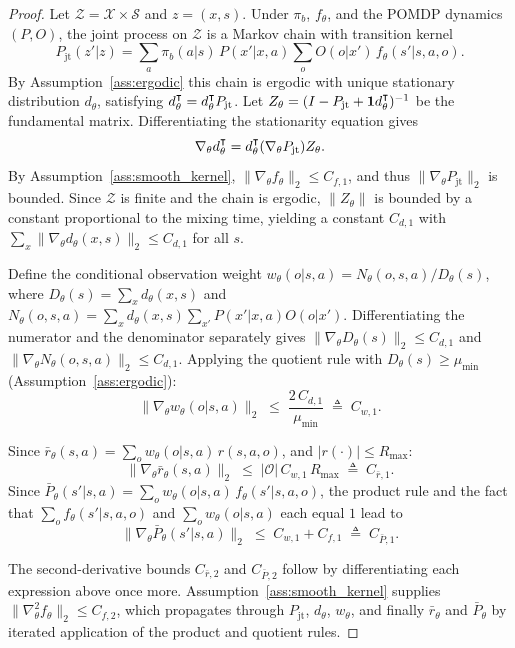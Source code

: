 \documentclass[12pt]{article}
\newcommand\raiseT[2]{\raisebox{0.25ex}{$#1#2$}
}
\renewcommand{\[}{\left[}
\renewcommand{\]}{\right]}
\renewcommand{\(}{\left(}
\renewcommand{\)}{\right)}
\newcounter{l1}
\newcounter{l2}
\newcounter{l3}
\renewcommand{\top}{{\mathpalette\raiseT\intercal}}
\newcommand{\Rmax}{R_{\max}}
\begin{document}
\begin{proof}
Let $\mathcal{Z} = \mathcal{X} \times \mathcal{S}$ and $z = (x,s)$. Under $\pi_b$,
$f_\theta$, and the POMDP dynamics $(P, O)$, the joint process on $\mathcal{Z}$ is a
Markov chain with transition kernel
\begin{equation*}
  P_{\mathrm{jt}}(z'|z)
  = \sum_{a} \pi_b(a|s)\, P(x'|x,a) \sum_{o} O(o|x')\, f_\theta(s'|s,a,o).
\end{equation*}
By Assumption~\ref{ass:ergodic} this chain is ergodic with unique stationary
distribution $d_\theta$, satisfying $d_\theta^\top = d_\theta^\top P_{\mathrm{jt}}$.
Let $Z_\theta = (I - P_{\mathrm{jt}} + \mathbf{1} d_\theta^\top)^{-1}$ be the fundamental
matrix. Differentiating the stationarity equation gives
\begin{equation*}
  \nabla_\theta d_\theta^\top = d_\theta^\top (\nabla_\theta P_{\mathrm{jt}}) Z_\theta.
\end{equation*}
By Assumption~\ref{ass:smooth_kernel}, $\|\nabla_\theta f_\theta\|_2 \le C_{f,1}$, and thus
$\|\nabla_\theta P_{\mathrm{jt}}\|_2$ is bounded. Since $\mathcal{Z}$ is finite and the
chain is ergodic, $\|Z_\theta\|$ is bounded by a constant proportional to the mixing
time, yielding a constant $C_{d,1}$ with
$\sum_{x}\|\nabla_\theta d_\theta(x,s)\|_2 \le C_{d,1}$ for all $s$.

Define the conditional observation weight
$w_\theta(o|s,a) = N_\theta(o,s,a) / D_\theta(s)$, where
$D_\theta(s) = \sum_x d_\theta(x,s)$ and
$N_\theta(o,s,a) = \sum_x d_\theta(x,s) \sum_{x'} P(x'|x,a) O(o|x')$.
Differentiating the numerator and the denominator separately gives
$\|\nabla_\theta D_\theta(s)\|_2 \le C_{d,1}$ and
$\|\nabla_\theta N_\theta(o,s,a)\|_2 \le C_{d,1}$.
Applying the quotient rule with $D_\theta(s) \ge \mu_{\min}$ (Assumption~\ref{ass:ergodic}):
\begin{equation*}
  \|\nabla_\theta w_\theta(o|s,a)\|_2
  \;\le\; \frac{2\,C_{d,1}}{\mu_{\min}}
  \;\triangleq\; C_{w,1}.
\end{equation*}

Since $\bar{r}_\theta(s,a) = \sum_o w_\theta(o|s,a)\,r(s,a,o)$, and $|r(\cdot)|\le\Rmax$:
\begin{equation*}
  \|\nabla_\theta \bar{r}_\theta(s,a)\|_2
  \;\le\; |\mathcal{O}|\,C_{w,1}\,\Rmax
  \;\triangleq\; C_{\bar{r},1}.
\end{equation*}
Since $\bar{P}_\theta(s'|s,a) = \sum_o w_\theta(o|s,a)\,f_\theta(s'|s,a,o)$, the
product rule and the fact that $\sum_o f_\theta(s'|s,a,o)$ and $\sum_o w_\theta(o|s,a)$
each equal $1$ lead to
\begin{equation*}
  \|\nabla_\theta \bar{P}_\theta(s'|s,a)\|_2
  \;\le\; C_{w,1} + C_{f,1}
  \;\triangleq\; C_{\bar{P},1}.
\end{equation*}

The second-derivative bounds $C_{\bar{r},2}$ and $C_{\bar{P},2}$ follow by
differentiating each expression above once more. Assumption~\ref{ass:smooth_kernel}
supplies $\|\nabla^2_\theta f_\theta\|_2 \le C_{f,2}$, which propagates through
$P_{\mathrm{jt}}$, $d_\theta$, $w_\theta$, and finally $\bar{r}_\theta$ and
$\bar{P}_\theta$ by iterated application of the product and quotient rules.
\end{proof}
\end{document}
